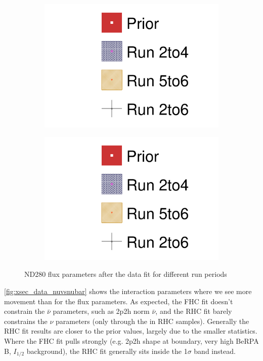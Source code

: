 \begin{figure}[h]
\begin{subfigure}[t]{0.24\textwidth}
		\includegraphics[width=\textwidth, trim={0mm 0mm 0mm 0mm}, clip,page=8]{figures/mach3/data/alt/2017b_Run2to4_Data_merge_2017b_Run56_Data_merge_2017b_NewData_NewDet_UpdXsecStep_2Xsec_4Det_5Flux_0}
	\end{subfigure}
	\begin{subfigure}[t]{0.24\textwidth}
		\includegraphics[width=\textwidth, trim={0mm 0mm 0mm 0mm}, clip,page=9]{figures/mach3/data/alt/2017b_Run2to4_Data_merge_2017b_Run56_Data_merge_2017b_NewData_NewDet_UpdXsecStep_2Xsec_4Det_5Flux_0}
	\end{subfigure}
	\caption{ND280 flux parameters after the data fit for different run periods}
	\label{fig:flux_data_nd280_nuvsnubar}
\end{figure}

\autoref{fig:xsec_data_nuvsnubar} shows the interaction parameters where we see more movement than for the flux parameters. As expected, the FHC fit doesn't constrain the $\bar{\nu}$ parameters, such as 2p2h norm $\bar{\nu}$, and the RHC fit barely constrains the $\nu$ parameters (only through the \numu in RHC samples). Generally the RHC fit results are closer to the prior values, largely due to the smaller statistics. Where the FHC fit pulls strongly (e.g. 2p2h shape at boundary, very high BeRPA B, $I_{1/2}$ background), the RHC fit generally sits inside the 1$\sigma$ band instead. 

